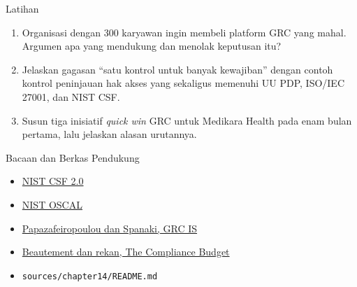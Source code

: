\documentclass[aspectratio=169, table, 12pt]{beamer}
\begin{document}
\begin{frame}{{\Large Latihan}}
  \vspace{4pt}
  \footnotesize
  \begin{enumerate}
    \item Organisasi dengan 300 karyawan ingin membeli platform GRC yang mahal. Argumen apa yang
          mendukung dan menolak keputusan itu?
    \item Jelaskan gagasan ``satu kontrol untuk banyak kewajiban'' dengan contoh kontrol peninjauan
          hak akses yang sekaligus memenuhi UU PDP, ISO/IEC 27001, dan NIST CSF.
    \item Susun tiga inisiatif \textit{quick win} GRC untuk Medikara Health pada enam bulan pertama,
          lalu jelaskan alasan urutannya.
  \end{enumerate}
\end{frame}

\begin{frame}{{\Large Bacaan dan Berkas Pendukung}}
  \vspace{6pt}
  \small
  \begin{itemize}
    \item \href{https://doi.org/10.6028/NIST.CSWP.29}{NIST CSF 2.0}
    \item \href{https://pages.nist.gov/OSCAL/}{NIST OSCAL}
    \item \href{https://doi.org/10.1007/s10796-015-9572-3}{Papazafeiropoulou dan Spanaki, GRC IS}
    \item \href{https://doi.org/10.1145/1595676.1595684}{Beautement dan rekan, The Compliance Budget}
    \item \texttt{sources/chapter14/README.md}
  \end{itemize}
\end{frame}
\end{document}
